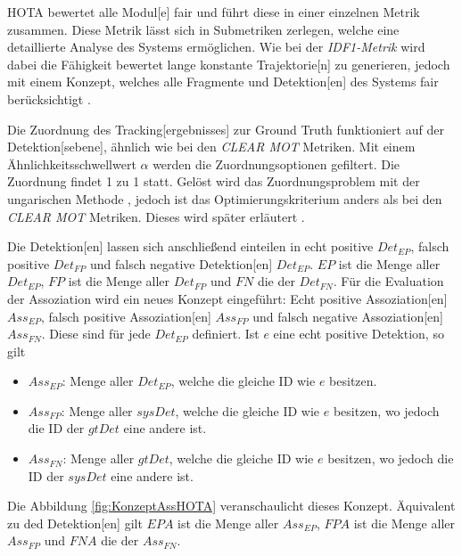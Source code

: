 \gls{HOTA} bewertet alle \gls{Modul}[e] fair und führt diese in einer einzelnen Metrik zusammen. Diese Metrik lässt sich in Submetriken zerlegen, welche eine detaillierte Analyse des Systems ermöglichen. Wie bei der \textit{\gls{IDF1}-Metrik} wird dabei die Fähigkeit bewertet lange konstante \gls{Trajektorie}[n] zu generieren, jedoch mit einem Konzept, welches alle Fragmente und \gls{Detektion}[en] des Systems fair berücksichtigt \cite{HOTA}. \par

Die Zuordnung des \gls{Tracking}[ergebnisses] zur \gls{Ground Truth} funktioniert auf der \gls{Detektion}[sebene], ähnlich wie bei den \textit{\acrshort{CLEAR} \gls{MOT}} Metriken. Mit einem Ähnlichkeitsschwellwert \(\alpha\) werden die Zuordnungsoptionen gefiltert. Die Zuordnung findet 1 zu 1 statt. Gelöst wird das Zuordnungsproblem mit der ungarischen Methode \cite{Kuhn.1955}, jedoch ist das Optimierungskriterium anders als bei den \textit{\acrshort{CLEAR} \gls{MOT}} Metriken. Dieses wird später erläutert \cite{HOTA}. \par

Die \gls{Detektion}[en] lassen sich anschließend einteilen in echt positive \(Det_{EP}\), falsch positive \(Det_{FP}\) und falsch negative \gls{Detektion}[en] \(Det_{EP}\). \(EP\) ist die Menge aller \(Det_{EP}\), \(FP\) ist die Menge aller \(Det_{FP}\) und \(FN\) die der \(Det_{FN}\). Für die Evaluation der \gls{Assoziation} wird ein neues Konzept eingeführt: Echt positive \gls{Assoziation}[en] \(Ass_{EP}\), falsch positive \gls{Assoziation}[en] \(Ass_{FP}\) und falsch negative \gls{Assoziation}[en] \(Ass_{FN}\). Diese sind für jede \(Det_{EP}\) definiert. Ist \(e\) eine echt positive \gls{Detektion}, so gilt

\begin{itemize}
    \item \(Ass_{EP}\): Menge aller \(Det_{EP}\), welche die gleiche \acrshort{ID} wie \(e\) besitzen.
    \item \(Ass_{FP}\): Menge aller \(sysDet\), welche die gleiche \acrshort{ID} wie \(e\) besitzen, wo jedoch die \acrshort{ID} der \(gtDet\) eine andere ist.
    \item \(Ass_{FN}\): Menge aller \(gtDet\), welche die gleiche \acrshort{ID} wie \(e\) besitzen, wo jedoch die \acrshort{ID} der \(sysDet\) eine andere ist.
\end{itemize}

Die Abbildung \ref{fig:KonzeptAssHOTA} veranschaulicht dieses Konzept. Äquivalent zu ded \gls{Detektion}[en] gilt \(EPA\) ist die Menge aller \(Ass_{EP}\), \(FPA\) ist die Menge aller \(Ass_{FP}\) und \(FNA\) die der \(Ass_{FN}\).
    
